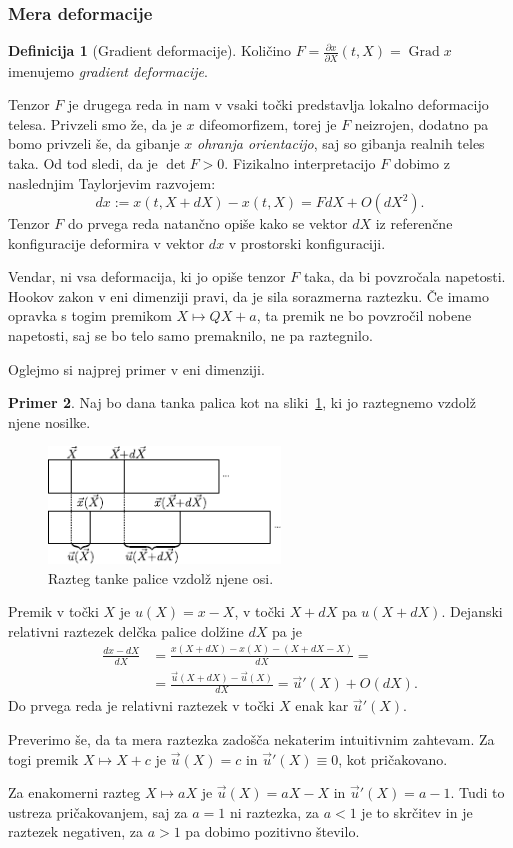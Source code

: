 \documentclass[12pt,a4paper,twoside]{article}
\theoremstyle{definition} %
\newtheorem{definicija}{Definicija}[section]
\newtheorem{primer}[definicija]{Primer}
\theoremstyle{plain} %
\numberwithin{equation}{section}
\newcommand{\Grad}{\operatorname{Grad}}
\newcommand{\dpar}[2]{\ensuremath{\frac{\partial #1}{\partial #2}}}
\newcommand{\vu}{\vec{u}}
\newcommand{\vX}{X}
\newcommand{\vx}{x}
\begin{document}
\subsubsection{Mera deformacije}
\begin{definicija}[Gradient deformacije]
  Količino $F = \dpar{\vx}{\vX}(t, \vX) = \Grad \vx$ imenujemo \emph{gradient
  deformacije}.
\end{definicija}

Tenzor $F$ je drugega reda in nam v vsaki točki predstavlja lokalno deformacijo
telesa. Privzeli smo že, da je $\vx$ difeomorfizem, torej je $F$ neizrojen,
dodatno pa bomo privzeli še, da gibanje $\vx$ \emph{ohranja orientacijo}, saj
so gibanja realnih teles taka. Od tod sledi, da je $\det F > 0$.
Fizikalno interpretacijo $F$ dobimo z naslednjim Taylorjevim razvojem:
\[
  d\vx := \vx(t, \vX+d\vX) - \vx(t, \vX) = F d\vX + O(d\vX^2).
\]
Tenzor $F$ do prvega reda natančno opiše kako se vektor $d\vX$ iz referenčne
konfiguracije deformira v vektor $d\vx$ v prostorski konfiguraciji.

Vendar, ni vsa deformacija, ki jo opiše tenzor $F$ taka, da bi povzročala
napetosti. Hookov zakon v eni dimenziji pravi, da je sila sorazmerna raztezku.
Če imamo opravka s togim premikom $\vX \mapsto Q\vX + a$, ta premik ne bo povzročil
nobene napetosti, saj se bo telo samo premaknilo, ne pa raztegnilo.

Oglejmo si najprej primer v eni dimenziji.
\begin{primer}
Naj bo dana tanka palica kot na sliki~\ref{fig:palica}, ki jo raztegnemo vzdolž
njene nosilke.
\begin{figure}[h]
  \centering
  \includegraphics[width=0.55\textwidth]{images/stretch1d.pdf}
  \caption{Razteg tanke palice vzdolž njene osi.}
  \label{fig:palica}
\end{figure}
Premik v točki $\vX$ je $u(\vX) = \vx - \vX$, v točki $\vX+d\vX$ pa $u(\vX+d\vX)$.
Dejanski relativni raztezek delčka palice dolžine $d\vX$ pa je
\begin{align*}
  \frac{d\vx - d\vX}{d\vX} &= \frac{\vx(\vX+d\vX) - \vx(\vX) - (\vX + d\vX - \vX)}{d\vX} = \\ &=
  \frac{\vu(\vX + d\vX) - \vu(\vX)}{d\vX} = \vu'(\vX) + O(d\vX).
\end{align*}
Do prvega reda je relativni raztezek v točki $\vX$ enak kar $\vu'(\vX)$.

Preverimo še, da ta mera raztezka zadošča nekaterim intuitivnim zahtevam. Za
togi premik $\vX \mapsto \vX + c$ je $\vu(\vX) = c$ in $\vu'(\vX) \equiv 0$, kot
pričakovano.

Za enakomerni razteg $\vX \mapsto a\vX$ je $\vu(\vX) = a\vX - \vX$ in $\vu'(\vX) = a - 1$. Tudi
to ustreza pričakovanjem, saj za $a = 1$ ni raztezka, za $a< 1$ je to skrčitev
in je raztezek negativen, za $a>1$ pa dobimo pozitivno število.
\end{primer}
\end{document}
